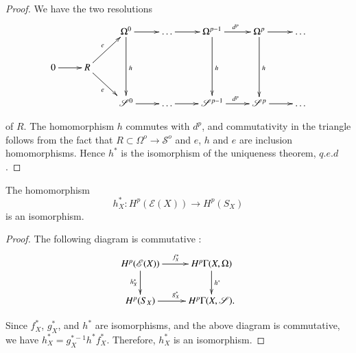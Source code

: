 \begin{proof}
We have the two resolutions
\[
\xymatrix{
& & \Omega^0\ar[r] \ar[dd]^h & \ldots \ar[r]&
  \Omega^{p-1}\ar[r]^{d^p}\ar[dd]^h & \Omega^p \ar[r] \ar[dd]^h &
  \ldots\\
0 \ar[r] & R\ar[ur]^e \ar[dr]_e & & & & & \\
& & \mathscr{S}^0 \ar[r] & \ldots \ar[r] & \mathscr{S}^{p-1}
\ar[r]^{d^p} & \mathscr{S}^p \ar[r] & \ldots 
}
\]

\noindent
of $R$. The homomorphism $h$  commutes with $ d^p $, and commutativity
in the triangle follows from the fact that $ R \subset \Omega^o
\rightarrow \mathscr{S}^o $ and $e$, $h$ and $e$ are inclusion
homomorphisms. Hence $h^* $ is the isomorphism of the uniqueness
theorem, $q. e. d$. 
\end{proof}

\begin{thm}[de Rham]%
The homomorphism 
$$
h^*_X : H^p ( \mathscr{E} (X)) \rightarrow  H^p (S_X ) 
$$
is an isomorphism.
\end{thm}

\begin{proof}
The following diagram is commutative :  
\[
\xymatrix{
H^p(\mathscr{E}(X)) \ar[r]^{f^{\ast}_X}
 \ar[d]_{h^{\ast}_X} & H^p\Gamma(X,\Omega)\ar[d]^{h^{\ast}}\\
H^p (S_X) \ar[r]^{g^{\ast}_X} & H^p\Gamma (X,\mathscr{S}).
}
\]\pageoriginale

Since $f^\ast_X$, $g^\ast_X $, and $h^\ast$ are isomorphisms, and the above
diagram is commutative, we have $h^\ast_X = g^{\ast-1}_X h^\ast
f^\ast_X$. Therefore, $h^\ast_X $ is an isomorphism.   
\end{proof}

